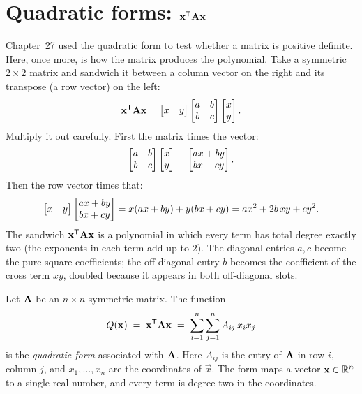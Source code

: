 \section{Quadratic forms: \texorpdfstring{$\mathbf{x}^{\mathsf{T}}\mathbf{A}\mathbf{x}$}{x'Ax}}
\label{ch36:quadforms}

Chapter~27 used the quadratic form to test whether a matrix is positive definite.
Here, once more, is how the matrix produces the polynomial. Take a symmetric $2\times 2$ matrix and sandwich it between a column vector on the
right and its transpose (a row vector) on the left:
\[
  \mathbf{x}^{\mathsf{T}}\mathbf{A}\mathbf{x}
  = \begin{bmatrix} x & y \end{bmatrix}
    \begin{bmatrix} a & b \\ b & c \end{bmatrix}
    \begin{bmatrix}x \\ y\end{bmatrix}.
\]
Multiply it out carefully. First the matrix times the vector:
\[
  \begin{bmatrix} a & b \\ b & c \end{bmatrix}\begin{bmatrix}x\\y\end{bmatrix}
  = \begin{bmatrix}ax+by \\ bx+cy\end{bmatrix}.
\]
Then the row vector times that:
\[
  \begin{bmatrix} x & y \end{bmatrix}\begin{bmatrix}ax+by\\bx+cy\end{bmatrix}
  = x(ax+by) + y(bx+cy)
  = a x^2 + 2b\,xy + c y^2.
\]
The sandwich $\mathbf{x}^{\mathsf{T}}\mathbf{A}\mathbf{x}$ is a polynomial in which every term has total
degree exactly two (the exponents in each term add up to $2$). The diagonal entries $a,c$ become the
pure-square coefficients; the off-diagonal entry $b$ becomes the coefficient of the
cross term $xy$, doubled because it appears in both off-diagonal slots.

\begin{definition}
\label{ch36:def-qform}
Let $\mathbf{A}$ be an $n\times n$ symmetric matrix. The function
\[
  Q(\mathbf{x}) \;=\; \mathbf{x}^{\mathsf{T}}\mathbf{A}\mathbf{x} \;=\; \sum_{i=1}^{n}\sum_{j=1}^{n} A_{ij}\,x_i x_j
\]
is the \emph{quadratic form} associated with $\mathbf{A}$. Here $A_{ij}$ is the entry of
$\mathbf{A}$ in row $i$, column $j$, and $x_1,\dots,x_n$ are the coordinates of $\vec{x}$.
The form maps a vector $\mathbf{x}\in\mathbb{R}^n$ to a single real number, and every term is
degree two in the coordinates.
\end{definition}

